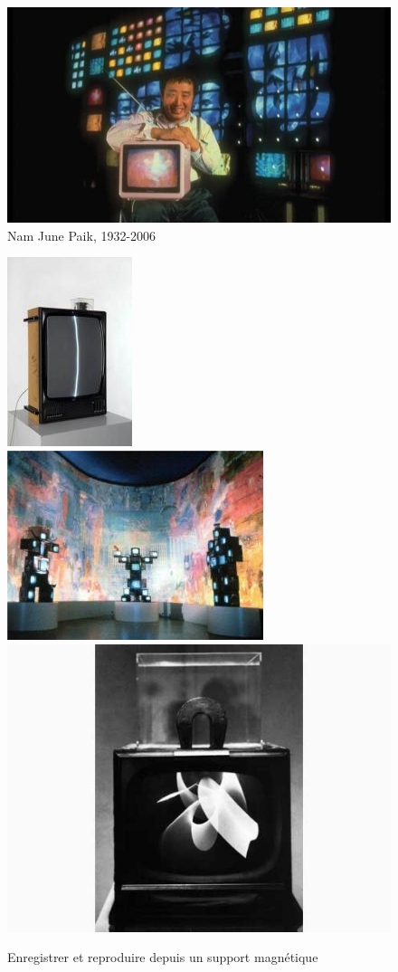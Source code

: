 \documentclass[
]{book}
\begin{document}
\begin{figure}
\centering
\includegraphics{medias/corpus/paik/paik_10.jpg}
\caption{Nam June Paik, 1932-2006}
\end{figure}

\begin{figure}

{\centering \includegraphics[width=0.32\linewidth]{medias/corpus/paik/____NamJunepaik_0220452w_namjunepaikzenfortv1961975_vignette_300_209_20150414152312_20150414153250} \includegraphics[width=0.32\linewidth]{medias/corpus/paik/__NamJunepaik_22222_vignette_300_209_20150414121039_20150414121316} \includegraphics[width=0.32\linewidth]{medias/corpus/paik/_NamJunepaik_paik_magnet_tv_20150506194428_20150506194457} 

}

\caption{Enregistrer et reproduire depuis un support magnétique}\label{fig:unnamed-chunk-4}
\end{figure}
\end{document}
